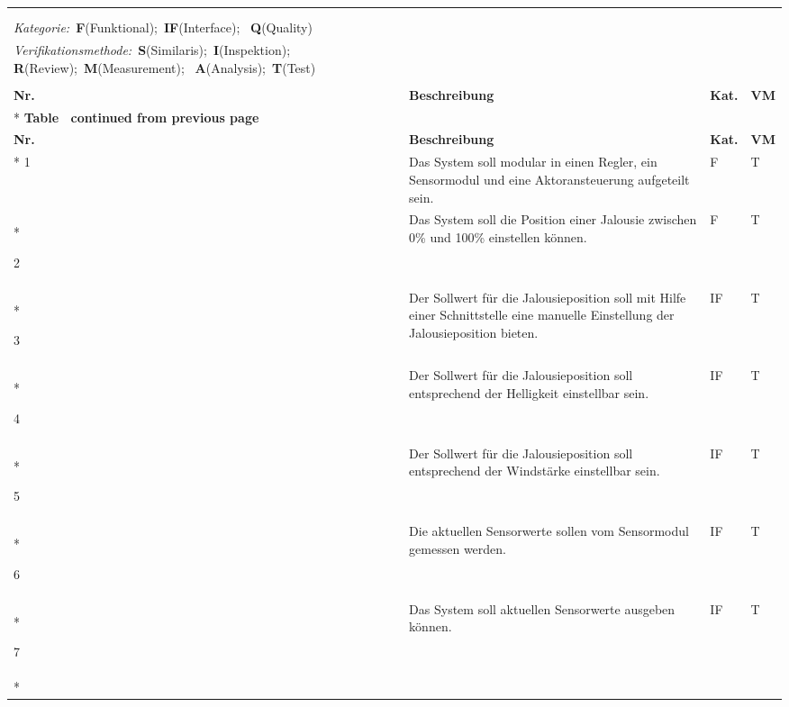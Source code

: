 \begin{longtable}[ht]{p{}  p{} p{} p{}}
	\captionabove[Requirements des Systems]{Requirements des Systems}\\
	\label{tab:requirements}\\
	\textit{Kategorie:}~\textbf{F}(Funktional);~\textbf{IF}(Interface);~
	\textbf{Q}(Quality)\\
	\textit{Verifikationsmethode:}~\textbf{S}(Similaris);~\textbf{I}(Inspektion);~
	\textbf{R}(Review);~\textbf{M}(Measurement);~
	\textbf{A}(Analysis);~\textbf{T}(Test)\\ 
	\\
	\toprule
	\rowcolor[HTML]{FFFC9E} 
	{\color[HTML]{333333} \textbf{Nr.}} & {\color[HTML]{333333} \textbf{Beschreibung}}  & {\color[HTML]{333333} \textbf{Kat.}} & {\color[HTML]{333333} \textbf{VM}} \\* \midrule
	\endfirsthead
	\multicolumn{4}{c}%
	{{\bfseries Table \thetable\ continued from previous page}} \\
	\toprule
	\rowcolor[HTML]{FFFC9E} 
	{\color[HTML]{333333} \textbf{Nr.}} & {\color[HTML]{333333} \textbf{Beschreibung}}  & {\color[HTML]{333333} \textbf{Kat.}} & {\color[HTML]{333333} \textbf{VM}} \\* \midrule
	\endhead
	1 & Das System soll modular in einen Regler, ein Sensormodul und eine Aktoransteuerung aufgeteilt sein. & F & T \\* \midrule
	
	2 & Das System soll die Position einer Jalousie zwischen 0\% und 100\% einstellen können. & F & T \\* \midrule
	
	3 & Der Sollwert für die Jalousieposition soll mit Hilfe einer Schnittstelle eine manuelle Einstellung der Jalousieposition bieten. & IF & T \\* \midrule
	
	4 & Der Sollwert für die Jalousieposition soll entsprechend der Helligkeit einstellbar sein. & IF& T \\* \midrule
	
	5 & Der Sollwert für die Jalousieposition soll entsprechend der Windstärke einstellbar sein. & IF& T \\* \midrule
	
	6 & Die aktuellen Sensorwerte sollen vom Sensormodul gemessen werden. & IF& T \\* \midrule
	
	7 & Das System soll aktuellen Sensorwerte ausgeben können. & IF & T \\* \midrule
	

\end{longtable}
